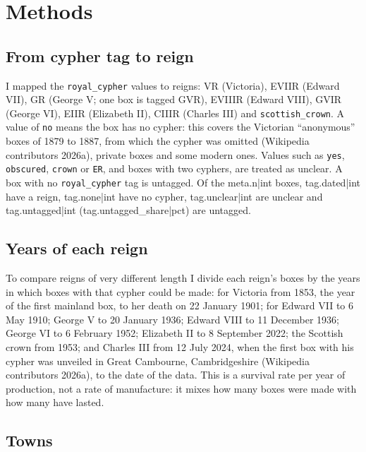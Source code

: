 \documentclass[11pt,a4paper]{article}
\begin{document}
\section{Methods}

\subsection{From cypher tag to reign}

I mapped the \texttt{royal\_cypher} values to reigns: VR (Victoria), EVIIR (Edward VII), GR (George V; one box is tagged GVR), EVIIIR (Edward VIII), GVIR (George VI), EIIR (Elizabeth II), CIIIR (Charles III) and \texttt{scottish\_crown}. A value of \texttt{no} means the box has no cypher: this covers the Victorian ``anonymous'' boxes of 1879 to 1887, from which the cypher was omitted (Wikipedia contributors 2026a), private boxes and some modern ones. Values such as \texttt{yes}, \texttt{obscured}, \texttt{crown} or \texttt{ER}, and boxes with two cyphers, are treated as unclear. A box with no \texttt{royal\_cypher} tag is untagged. Of the {{meta.n|int}} boxes, {{tag.dated|int}} have a reign, {{tag.none|int}} have no cypher, {{tag.unclear|int}} are unclear and {{tag.untagged|int}} ({{tag.untagged_share|pct}}) are untagged.

\subsection{Years of each reign}

To compare reigns of very different length I divide each reign's boxes by the years in which boxes with that cypher could be made: for Victoria from 1853, the year of the first mainland box, to her death on 22 January 1901; for Edward VII to 6 May 1910; George V to 20 January 1936; Edward VIII to 11 December 1936; George VI to 6 February 1952; Elizabeth II to 8 September 2022; the Scottish crown from 1953; and Charles III from 12 July 2024, when the first box with his cypher was unveiled in Great Cambourne, Cambridgeshire (Wikipedia contributors 2026a), to the date of the data. This is a survival rate per year of production, not a rate of manufacture: it mixes how many boxes were made with how many have lasted.

\subsection{Towns}
\end{document}
